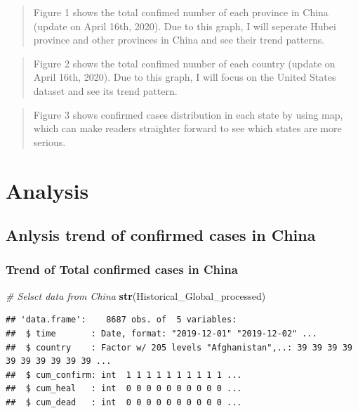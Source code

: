 \documentclass[12pt,]{article}
\newenvironment{Shaded}{\begin{snugshade}}{\end{snugshade}}
\newcommand{\CommentTok}[1]{\textcolor[rgb]{0.56,0.35,0.01}{\textit{#1}}}
\newcommand{\KeywordTok}[1]{\textcolor[rgb]{0.13,0.29,0.53}{\textbf{#1}}}
\newcommand{\NormalTok}[1]{#1}
\begin{document}
\begin{quote}
Figure 1 shows the total confimed number of each province in China
(update on April 16th, 2020). Due to this graph, I will seperate Hubei
province and other provinces in China and see their trend patterns.
\end{quote}

\begin{quote}
Figure 2 shows the total confimed number of each country (update on
April 16th, 2020). Due to this graph, I will focus on the United States
dataset and see its trend pattern.
\end{quote}

\begin{quote}
Figure 3 shows confirmed cases distribution in each state by using map,
which can make readers straighter forward to see which states are more
serious.
\end{quote}

\newpage

\hypertarget{analysis}{%
\section{Analysis}\label{analysis}}

\hypertarget{anlysis-trend-of-confirmed-cases-in-china}{%
\subsection{Anlysis trend of confirmed cases in
China}\label{anlysis-trend-of-confirmed-cases-in-china}}

\hypertarget{trend-of-total-confirmed-cases-in-china}{%
\subsubsection{Trend of Total confirmed cases in
China}\label{trend-of-total-confirmed-cases-in-china}}

\begin{Shaded}
\begin{Highlighting}[]
\CommentTok{# Selsct data from China}
\KeywordTok{str}\NormalTok{(Historical_Global_processed)}
\end{Highlighting}
\end{Shaded}

\begin{verbatim}
## 'data.frame':    8687 obs. of  5 variables:
##  $ time       : Date, format: "2019-12-01" "2019-12-02" ...
##  $ country    : Factor w/ 205 levels "Afghanistan",..: 39 39 39 39 39 39 39 39 39 39 ...
##  $ cum_confirm: int  1 1 1 1 1 1 1 1 1 1 ...
##  $ cum_heal   : int  0 0 0 0 0 0 0 0 0 0 ...
##  $ cum_dead   : int  0 0 0 0 0 0 0 0 0 0 ...
\end{verbatim}
\end{document}
